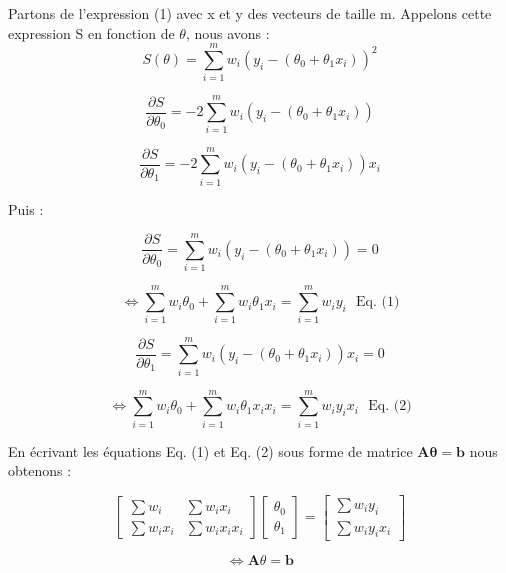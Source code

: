 \documentclass[a4paper,12pt]{article} %
\begin{document}
                    Partons de l'expression (1) avec  x et y  des vecteurs de taille m. Appelons cette expression S en fonction de $\theta$, nous avons :
                    \[S(\theta) = \sum_{i=1}^m w_i \left( y_i - (\theta_0 + \theta_1 x_i) \right)^2\]
                    
                    \[\frac{\partial S}{\partial \theta_0} = -2 \sum_{i=1}^m w_i \left( y_i - (\theta_0 + \theta_1 x_i) \right) \]
                    
                    \[ \frac{\partial S}{\partial \theta_1} = -2 \sum_{i=1}^m w_i \left( y_i - (\theta_0 + \theta_1 x_i) \right) x_i \]
                    
                    
                    Puis :
                    
                    \[\frac{\partial S}{\partial \theta_0} = \sum_{i=1}^m w_i \left( y_i - (\theta_0 + \theta_1 x_i) \right)  = 0\]
                    
                    \[ \iff \sum_{i=1}^m w_i  \theta_0 + \sum_{i=1}^m w_i  \theta_1 x_i  = \sum_{i=1}^m w_i y_i  \ \ \ \text{Eq. (1)}\]
                    
                    \[\frac{\partial S}{\partial \theta_1} = \sum_{i=1}^m w_i \left( y_i - (\theta_0 + \theta_1 x_i) \right) x_i  = 0\] 
                    
                    \[\iff \sum_{i=1}^m w_i  \theta_0 + \sum_{i=1}^m w_i  \theta_1 x_i x_i  = \sum_{i=1}^m w_i y_i  x_i \ \ \ \text{Eq. (2)}\]
                    
                    
                    En écrivant les équations  Eq. (1) et Eq. (2) sous forme de matrice $\mathbf{A \theta = b}$ nous obtenons :
                    
                    
                    
                        \[\begin{bmatrix} \sum w_i & \sum w_i x_i \\ \sum w_i x_i & \sum w_i x_i x_i \end{bmatrix}  \begin{bmatrix} \theta_0 \\ \theta_1 \end{bmatrix}   = \begin{bmatrix}  \sum w_i y_i \\  \sum w_i y_i x_i \end{bmatrix}\] 
                    
                        \[\iff \mathbf{A} \theta = \mathbf{b}\]
                    
\end{document}
